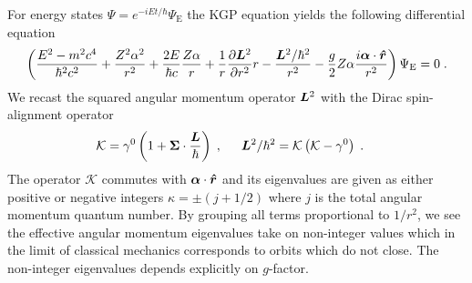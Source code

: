 For energy states $\Psi=e^{-iEt/\hbar}\Psi_\mathrm{E}$ the KGP equation yields the following differential equation
\begin{alignat}{1}
	\label{cou02} \left(\frac{E^{2}-m^{2}c^{4}}{\hbar^{2}c^{2}}+\frac{Z^{2}\alpha^{2}}{r^{2}}+\frac{2E}{\hbar c}\frac{Z\alpha}{r}+\frac{1}{r}\frac{\partial\boldsymbol{L}^{2}}{\partial r^{2}}r-\frac{\boldsymbol{L}^{2}/\hbar^{2}}{r^{2}}-\frac{g}{2}Z\alpha\frac{i\boldsymbol{\alpha}\cdot\boldsymbol{\hat{r}}}{r^{2}}\right)\Psi_\mathrm{E}=0\;.
\end{alignat}
We recast the squared angular momentum operator $\boldsymbol{L}^{2}$ with the Dirac spin-alignment operator
\begin{alignat}{1}
\label{cou04} &\mathcal{K}=\gamma^{0}\left(1+\bb{\Sigma}\cdot\frac{\bb{L}}{\hbar}\right)\;,\indent \bb{L}^{2}/\hbar^{2}=\mathcal{K}\left(\mathcal{K}-\gamma^{0}\right)\;.
\end{alignat}
The operator $\mathcal{K}$ commutes with $\boldsymbol{\alpha}\cdot\boldsymbol{\hat{r}}$ and its eigenvalues are given as either positive or negative integers $\kappa=\pm(j+1/2)$ where $j$ is the total angular momentum quantum number. By grouping all terms proportional to $1/r^{2}$, we see the effective angular momentum eigenvalues take on non-integer values which in the limit of classical mechanics corresponds to orbits which do not close. The non-integer eigenvalues depends explicitly on $g$-factor.

